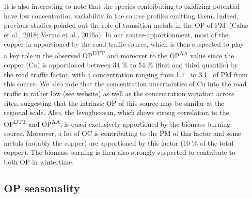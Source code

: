 \documentclass[
]{article}
\begin{document}
It is also interesting to note that the species contributing to
oxidizing potential have low concentration variability in the source
profiles emitting them. Indeed, previous studies pointed out the role of
transition metals in the OP of PM~(Calas et al., 2018; Verma et al.,
2015a). In our source-apportionment, most of the copper in apportioned
by the road traffic source, which is then suspected to play a key role
in the observed OP\textsuperscript{DTT} and moreover to the
OP\textsuperscript{AA} value since the copper (Cu) is apportioned
between 34 \% to 54 \% (first and third quantile) by the road traffic
factor, with a concentration ranging from 1.7~ to 3.1~ of PM from this
source. We also note that the concentration uncertainties of Cu into the
road traffic is rather low (see website) as well as the concentration
variation across sites, suggesting that the intrinsic OP of this source
may be similar at the regional scale. Also, the levoglucosan, which
shows strong correlation to the OP\textsuperscript{DTT} and
OP\textsuperscript{AA}, is quasi-exclusively apportioned by the
biomass-burning source. Moreover, a lot of OC is contributing to the PM
of this factor and some metals (notably the copper) are apportioned by
this factor (10 \% of the total copper). The biomass burning is then
also strongly suspected to contribute to both OP in wintertime.

\hypertarget{op-seasonality}{%
\subsection{OP seasonality}\label{op-seasonality}}
\end{document}

